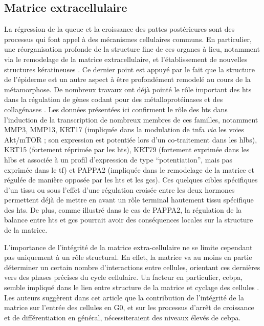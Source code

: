 \documentclass[../main.tex]{subfiles}
\begin{document}
	\subsection{Matrice extracellulaire}
		La régression de la queue et la croissance des pattes postérieures sont des processus qui font appel à des mécanismes cellulaires communs.
		En particulier, une réorganisation profonde de la structure fine de ces organes à lieu, notamment via le remodelage de la matrice extracellulaire, et l'établissement de nouvelles structures kératineuses \citep{Schreiber2003}.
		Ce dernier point est appuyé par le fait que la structure de l'épiderme est un autre aspect à être profondément remodelé au cours de la métamorphose.
		De nombreux travaux ont déjà pointé le rôle important des \glspl{ht} dans la régulation de gènes codant pour des métalloprotéinases et des collagénases \citep{Jung2004,Fu2007}.
		Les données présentées ici confirment le rôle des \glspl{ht} dans l'induction de la transcription de nombreux membres de ces familles, notamment MMP3, MMP13, KRT17 (impliquée dans la modulation de \gls{tnfa} \textit{via} les voies Akt/mTOR ; son expression est potentiée lors d'un co-traitement dans les \glspl{hlb}), KRT15 (fortement réprimée par les \glspl{ht}), KRT79 (fortement exprimée dans les \glspl{hlb} et associée à un profil d'expression de type ``potentiation'', mais pas exprimée dans le \gls{tf}) et PAPPA2 (impliquée dans le remodelage de la matrice et régulée de manière opposée par les \glspl{ht} et les \glspl{gc}).
		Ces quelques cibles spécifiques d'un tissu ou sous l'effet d'une régulation croisée entre les deux hormones permettent déjà de mettre en avant un rôle terminal hautement tissu spécifique des \glspl{ht}.
		De plus, comme illustré dans le cas de PAPPA2, la régulation de la balance entre \glspl{ht} et \glspl{gc} pourrait avoir des conséquences locales sur la structure de la matrice.
		\par
		L'importance de l'intégrité de la matrice extra-cellulaire ne se limite cependant pas uniquement à un rôle structural.
		En effet, la matrice va au moins en partie déterminer un certain nombre d'interactions entre cellules, orientant ces dernières vers des phases précises du cycle cellulaire.
		Un facteur en particulier, \gls{cebpa}, semble impliqué dans le lien entre structure de la matrice et cyclage des cellules \citep{Rana1994}.
		Les auteurs suggèrent dans cet article que la contribution de l'intégrité de la matrice sur l'entrée des cellules en G0, et sur les processus d’arrêt de croissance et de différentiation en général, nécessiteraient des niveaux élevés de \gls{cebpa}.
\end{document}
